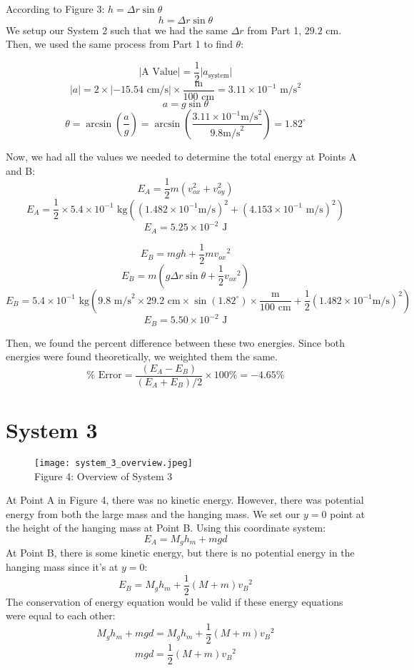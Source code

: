 \documentclass[fleqn]{article}
\begin{document}
According to Figure 3: $h = \Delta r \sin \theta$
\[ h = \Delta r \sin \theta \]
We setup our System 2 such that we had the same $\Delta r$ from Part 1, $29.2$ cm. Then, we used the same process from Part 1 to find $\theta$:

\[ |\text{A Value}|= \frac{1}{2} |{a _{\text{system}}| }   \]
\[ |a|=2 \times |{-15.54 \text{ cm/s}}| \times \frac{\text{m} }{100 \text{ cm} } = 3.11 \times 10^{-1}\text{ m/s}^2  \]
\[ a = g \sin \theta \]
\[ \theta = \arcsin\left(\frac{a}{g} \right)=
	\arcsin \left( \frac{3.11 \times 10^{-1} \text{m/s}^2 }{9.8 \text{m/s}^2 }  \right)=
	1.82^\circ
\]

Now, we had all the values we needed to determine the total energy at Points A and B:
\[ E_A=
	\frac{1}{2} m \left( v _{ox}^2+v _{oy}^2   \right)
\]
\[ E_A=
	\frac{1}{2} \times 5.4 \times 10^{-1} \text{ kg}
	\left( (1.482 \times 10^{-1} \text{m/s} )^2 + (
	4.153 \times 10^{-1} \text{ m/s}
	)^2
	\right)
\]
\[ E_A=5.25 \times 10^{-2} \text{ J} \]

\[ E_B = mgh + \frac{1}{2} m{v _{ox} }^2 \]
\[ E_B= m \left( g \Delta r \sin \theta+ \frac{1}{2} {v _{ox} }^2  \right) \]
\[ E_B =
	5.4 \times 10^{-1} \text{ kg} \left( 9.8 \text{ m/s}^2 \times 29.2 \text{ cm} \times \sin \left( 1.82^\circ \right)\times \frac{\text{m} }{100 \text{ cm} }
	+ \frac{1}{2} (1.482 \times 10^{-1} \text{m/s} )^2
	\right)
\]
\[ E_B = 5.50 \times 10^{-2}\text{ J}   \]

Then, we found the percent difference between these two energies. Since both energies were found theoretically, we weighted them the same.
\[ \% \text{ Error}  = \frac{(E_A - E_B)}{(E_A+E_B)/2} \times 100\%
	=-4.65\%
\]

\section*{System 3}
\begin{figure}[H]
	\texttt{[image: system\_3\_overview.jpeg]}
	\\Figure 4: Overview of System 3
\end{figure}
At Point A in Figure 4, there was no kinetic energy. However, there was potential energy from both the large mass and the hanging mass. We set our $y=0$ point at the height of the hanging mass at Point B. Using this coordinate system:
\[ E_A= M_gh_m + mgd \]
At Point B, there is some kinetic energy, but there is no potential energy in the hanging mass since it's at $y=0$:
\[ E_B = M_gh_m+ \frac{1}{2} \left( M+m \right){v_B}^2 \]
The conservation of energy equation would be valid if these energy equations were equal to each other:
\[ M_gh_m+mgd = M_gh_m + \frac{1}{2}\left( M+m \right){v_B}^2 \]
\[ mgd= \frac{1}{2}\left( M+m \right){v_B}^2 \]
\end{document}
